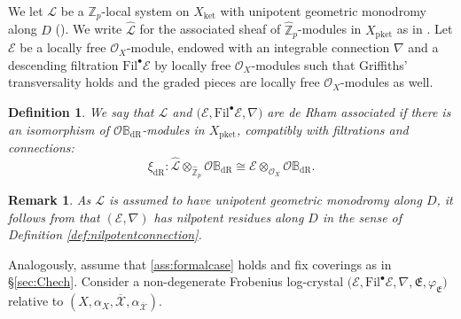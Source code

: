 \documentclass[asterisque,english]{smfart}
\newtheorem{definition}{Definition}[]
\newtheorem{remark}[theo]{Remark}
\begin{document}
We let $\mathcal{L}$ be a $\mathbb{Z}_p$-local system on $X_{\mathrm{ket}}$ with unipotent geometric monodromy along $D$ (\cite[Def. 6.3.1 \& Def. 6.3.7]{DLLZa}). We write $\widehat{\mathcal{L}}$ for the associated sheaf of $\widehat{\mathbb{Z}}_p$-modules in $X_{\mathrm{pket}}$ as in \cite[Def. 6.3.2]{DLLZa}. Let $\mathcal{E}$ be a locally free $\mathcal{O}_X$-module, endowed with an integrable connection $\nabla$ and a descending filtration $\mathrm{Fil}^\bullet \mathcal{E}$ by locally free $\mathcal{O}_X$-modules such that Griffiths' transversality holds and the graded pieces are locally free $\mathcal{O}_X$-modules as well. 

\begin{definition} We say that $\mathcal{L}$ and $\bigl(\mathcal{E},\mathrm{Fil}^\bullet \mathcal{E},\nabla\bigr)$ are de Rham associated if there is an isomorphism of $\mathcal{O}\mathbb{B}_{\mathrm{dR}}$-modules in $X_{\mathrm{pket}}$, compatibly with filtrations and connections: $$\xi_{\mathrm{dR}}\colon  \widehat{\mathcal{L}}\otimes_{\widehat{\mathbb{Z}}_p} \mathcal{O}\mathbb{B}_{\mathrm{dR}}\cong \mathcal{E}\otimes_{\mathcal{O}_X}  \mathcal{O}\mathbb{B}_{\mathrm{dR}}.$$
\end{definition}

\begin{remark}\label{rmk:unipotentnilpotent} As $\mathcal{L}$ is assumed to have unipotent geometric monodromy along $D$, it follows from \cite[Thm.~3.2.12]{DLLZb} that $(\mathcal{E},\nabla)$ has nilpotent residues along $D$ in the sense of Definition \ref{def:nilpotentconnection}.
\end{remark}


Analogously, assume that \ref{ass:formalcase} holds and fix coverings as in \S \ref{sec:Chech}.  Consider a non-degenerate Frobenius log-crystal $ \bigl(\mathcal{E},\mathrm{Fil}^\bullet \mathcal{E}, \nabla,\mathfrak{E},\varphi_{\mathfrak{E}}\bigr)$ relative to $(X,\alpha_X,\overline{\mathcal{X}},\alpha_{\overline{\mathcal{X}}})$. 
\end{document}
